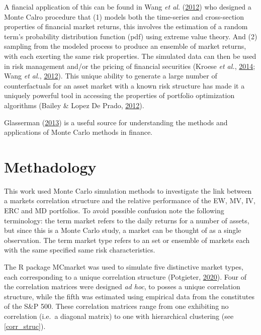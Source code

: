 \documentclass[11pt,preprint, authoryear]{elsarticle}
\numberwithin{equation}{section}
\numberwithin{figure}{section}
\numberwithin{table}{section}
\begin{document}
A fiancial application of this can be found in Wang \emph{et al.}
(\protect\hyperlink{ref-wang2012}{2012}) who designed a Monte Calro
procedure that (1) models both the time-series and cross-section
properties of financial market returns, this involves the estimation of
a random term's probability distribution function (pdf) using extreme
value theory. And (2) sampling from the modeled process to produce an
ensemble of market returns, with each exerting the same risk properties.
The simulated data can then be used in risk management and/or the
pricing of financial securities (Kroese \emph{et al.},
\protect\hyperlink{ref-kroese2014}{2014}; Wang \emph{et al.},
\protect\hyperlink{ref-wang2012}{2012}). This unique ability to generate
a large number of counterfactuals for an asset market with a known risk
structure has made it a uniquely powerful tool in accessing the
properties of portfolio optimization algorithms (Bailey \& Lopez De
Prado, \protect\hyperlink{ref-lopez2012}{2012}).

Glasserman (\protect\hyperlink{ref-glasserman2013}{2013}) is a useful
source for understanding the methods and applications of Monte Carlo
methods in finance.

\hypertarget{methadology}{%
\section{\texorpdfstring{Methadology
\label{methadology}}{Methadology }}\label{methadology}}

This work used Monte Carlo simulation methods to investigate the link
between a markets correlation structure and the relative performance of
the EW, MV, IV, ERC and MD portfolios. To avoid possible confusion note
the following terminology: the term market refers to the daily returns
for a number of assets, but since this is a Monte Carlo study, a market
can be thought of as a single observation. The term market type refers
to an set or ensemble of markets each with the same specified same risk
characteristics.

The R package MCmarket was used to simulate five distinctive market
types, each corresponding to a unique correlation structure (Potgieter,
\protect\hyperlink{ref-MCmarket}{2020}). Four of the correlation
matrices were designed \emph{ad hoc}, to posses a unique correlation
structure, while the fifth was estimated using empirical data from the
constitutes of the S\&P 500. These correlation matrices range from one
exhibiting no correlation (i.e.~a diagonal matrix) to one with
hierarchical clustering (see \ref{corr_struc}).
\end{document}
